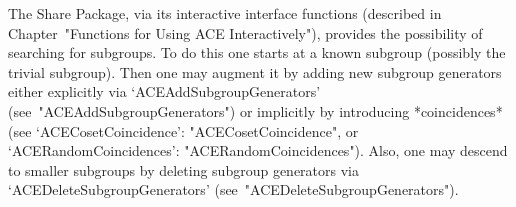 
The  {\ACE}  Share  Package,  via  its  interactive  {\ACE}  interface
functions   (described   in   Chapter~"Functions   for    Using    ACE
Interactively"), provides the possibility of searching for  subgroups.
To do this one starts  at  a  known  subgroup  (possibly  the  trivial
subgroup). Then one may augment it by adding new  subgroup  generators
either        explicitly        via         `ACEAddSubgroupGenerators'
(see~"ACEAddSubgroupGenerators")   or   implicitly   by    introducing
*coincidences*     (see     `ACECosetCoincidence':
"ACECosetCoincidence",           or           `ACERandomCoincidences':
"ACERandomCoincidences"). Also, one may descend to  smaller  subgroups
by  deleting  subgroup  generators  via  `ACEDeleteSubgroupGenerators'
(see~"ACEDeleteSubgroupGenerators").

